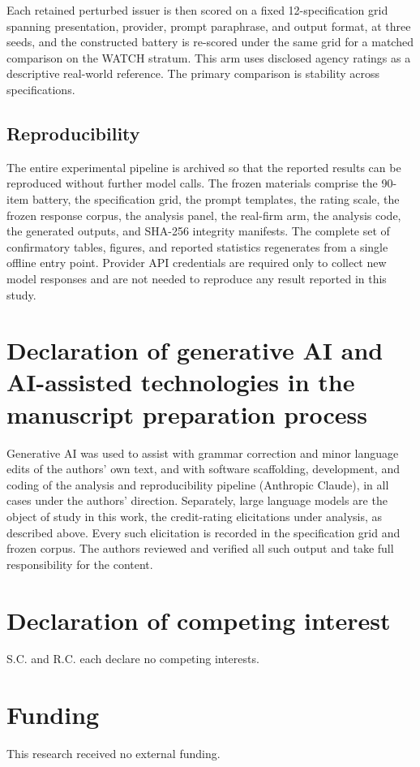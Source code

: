 \documentclass[a4paper,fleqn]{cas-sc}
\begin{document}
Each retained perturbed issuer is then scored on a fixed 12-specification grid spanning presentation,
provider, prompt paraphrase, and output format, at three seeds, and the constructed battery is re-scored
under the same grid for a matched comparison on the WATCH stratum. This arm uses disclosed agency ratings
as a descriptive real-world reference. The primary comparison is stability across specifications.

\subsection{Reproducibility}
The entire experimental pipeline is archived so that the reported results can be reproduced without
further model calls. The frozen materials comprise the 90-item battery, the specification grid, the
prompt templates, the rating scale, the frozen response corpus, the analysis panel, the real-firm arm,
the analysis code, the generated outputs, and SHA-256 integrity manifests. The complete set of
confirmatory tables, figures, and reported statistics regenerates from a single offline entry point.
Provider API credentials are required only to collect new model responses and are not needed to reproduce
any result reported in this study.

\section*{Declaration of generative AI and AI-assisted technologies in the manuscript preparation process}
Generative AI was used to assist with grammar correction and minor language edits of the authors' own
text, and with software scaffolding, development, and coding of the analysis and reproducibility pipeline
(Anthropic Claude), in all cases under the authors' direction. Separately, large language models are the
object of study in this work, the credit-rating elicitations under analysis, as described above. Every
such elicitation is recorded in the specification grid and frozen corpus. The authors reviewed and
verified all such output and take full responsibility for the content.


\section*{Declaration of competing interest}
S.C. and R.C. each declare no competing interests.

\section*{Funding}
This research received no external funding.
\end{document}
